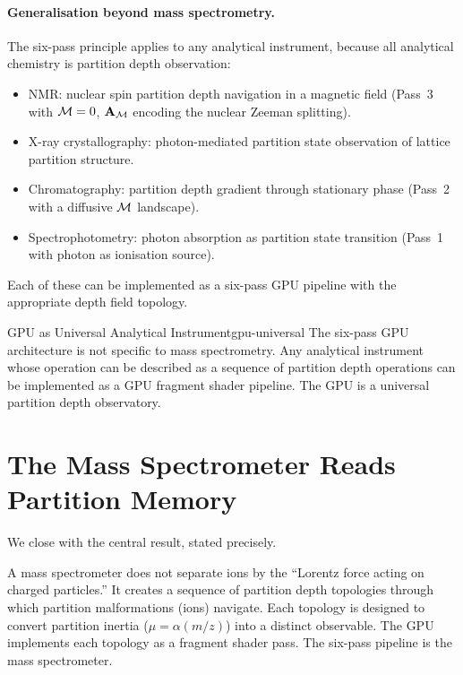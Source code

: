 \paragraph{Generalisation beyond mass spectrometry.}
The six-pass principle applies to any analytical instrument, because all
analytical chemistry is partition depth observation:

\begin{itemize}
  \item NMR: nuclear spin partition depth navigation in a magnetic field
    (Pass~3 with $\mathcal{M} = 0$, $\mathbf{A}_{\mathcal{M}}$ encoding the nuclear Zeeman
    splitting).
  \item X-ray crystallography: photon-mediated partition state observation
    of lattice partition structure.
  \item Chromatography: partition depth gradient through stationary phase
    (Pass~2 with a diffusive $\mathcal{M}$ landscape).
  \item Spectrophotometry: photon absorption as partition state transition
    (Pass~1 with photon as ionisation source).
\end{itemize}

Each of these can be implemented as a six-pass GPU pipeline with the
appropriate depth field topology.

\begin{consequence}{GPU as Universal Analytical Instrument}{gpu-universal}
  The six-pass GPU architecture is not specific to mass spectrometry.  Any
  analytical instrument whose operation can be described as a sequence of
  partition depth operations can be implemented as a GPU fragment shader
  pipeline.  The GPU is a universal partition depth observatory.
\end{consequence}

\section{The Mass Spectrometer Reads Partition Memory}
\label{sec:ch22-conclusion}

We close with the central result, stated precisely.

A mass spectrometer does not separate ions by the ``Lorentz force acting on
charged particles.''  It creates a sequence of partition depth topologies
through which partition malformations (ions) navigate.  Each topology is
designed to convert partition inertia ($\mu = \alpha(m/z)$) into a distinct
observable.  The GPU implements each topology as a fragment shader pass.
The six-pass pipeline is the mass spectrometer.

